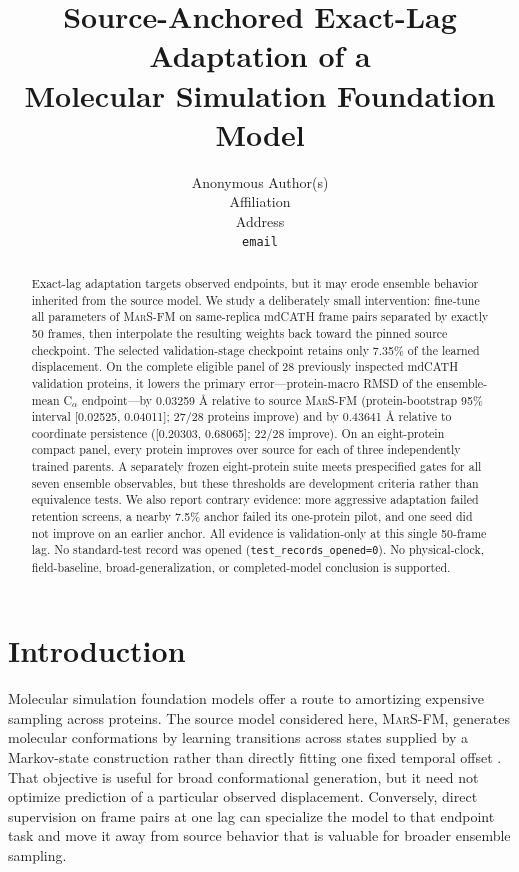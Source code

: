 \documentclass{article}
\title{Source-Anchored Exact-Lag Adaptation of a\\Molecular Simulation Foundation Model}
\author{%
  Anonymous Author(s) \\
  Affiliation \\
  Address \\
  \texttt{email} \\
}
\newcommand{\marsfm}{\textsc{MarS-FM}}
\newcommand{\CA}{C$_\alpha$}
\begin{document}
\maketitle

\begin{abstract}
  Exact-lag adaptation targets observed endpoints, but it may erode ensemble behavior inherited from the source model. We study a deliberately small intervention: fine-tune all parameters of \marsfm{} on same-replica mdCATH frame pairs separated by exactly 50 frames, then interpolate the resulting weights back toward the pinned source checkpoint. The selected validation-stage checkpoint retains only 7.35\% of the learned displacement. On the complete eligible panel of 28 previously inspected mdCATH validation proteins, it lowers the primary error---protein-macro RMSD of the ensemble-mean \CA{} endpoint---by 0.03259 \AA\@{} relative to source \marsfm{} (protein-bootstrap 95\% interval [0.02525, 0.04011]; 27/28 proteins improve) and by 0.43641 \AA\@{} relative to coordinate persistence ([0.20303, 0.68065]; 22/28 improve). On an eight-protein compact panel, every protein improves over source for each of three independently trained parents. A separately frozen eight-protein suite meets prespecified gates for all seven ensemble observables, but these thresholds are development criteria rather than equivalence tests. We also report contrary evidence: more aggressive adaptation failed retention screens, a nearby 7.5\% anchor failed its one-protein pilot, and one seed did not improve on an earlier anchor. All evidence is validation-only at this single 50-frame lag. No standard-test record was opened (\texttt{test\_records\_opened=0}). No physical-clock, field-baseline, broad-generalization, or completed-model conclusion is supported.
\end{abstract}

\section{Introduction}

Molecular simulation foundation models offer a route to amortizing expensive sampling across proteins. The source model considered here, \marsfm{}, generates molecular conformations by learning transitions across states supplied by a Markov-state construction rather than directly fitting one fixed temporal offset \citep{kapusniak2025marsfm}. That objective is useful for broad conformational generation, but it need not optimize prediction of a particular observed displacement. Conversely, direct supervision on frame pairs at one lag can specialize the model to that endpoint task and move it away from source behavior that is valuable for broader ensemble sampling.
\end{document}
